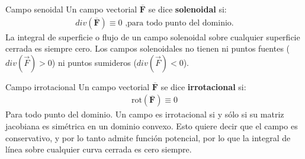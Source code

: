 \documentclass[a4paper, twoside]{article}
\numberwithin{equation}{section}
\numberwithin{figure}{section}
\numberwithin{table}{section}
\newcommand{\vect}[1]{\overline{\textbf{#1}}}
\begin{document}
\begin{definicion*}{Campo senoidal}
	Un campo vectorial $\vect{F}$ se dice \textbf{solenoidal} si:
	\begin{align}
		div(\vect{F})\equiv0 \text{ ,para todo punto del dominio.}
	\end{align} 
	La integral de superficie o flujo de un campo solenoidal sobre cualquier superficie cerrada es siempre cero. Los campos solenoidales no tienen ni puntos fuentes ($div(\vec{F}) > 0$) ni puntos sumideros ($div(\vec{F}) < 0$).
\end{definicion*}

\begin{definicion*}{Campo irrotacional}
	Un campo vectorial $\vect{F}$ se dice \textbf{irrotacional} si:
	\begin{align}
		\text{rot}(\vect{F})\equiv 0
	\end{align}
	Para todo punto del dominio. Un campo es irrotacional si y sólo si su matriz jacobiana es simétrica en un dominio convexo. Esto quiere decir que el campo es conservativo, y por lo tanto admite función potencial, por lo que la integral de línea sobre cualquier curva cerrada es cero siempre.
\end{definicion*}
\end{document}
